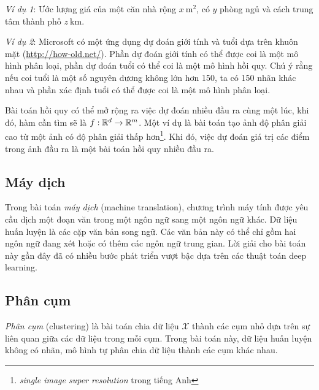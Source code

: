 \textit{Ví dụ 1}: Ước lượng giá của một căn nhà rộng $x ~ \text{m}^2$, có $y$
phòng ngủ và cách trung tâm thành phố $z~ \text{km}$.

\textit{Ví dụ 2}: Microsoft có một ứng dụng dự đoán giới tính và tuổi dựa trên
khuôn mặt (\url{http://how-old.net/}). Phần dự đoán giới tính có thể được coi là
một mô hình phân loại, phần dự đoán tuổi có thể coi là một mô hình hồi quy. Chú ý rằng nếu coi tuổi là một số nguyên dương không lớn hơn 150, ta có 150
nhãn khác nhau và phần xác định tuổi có thể được coi là một mô hình phân loại.

Bài toán hồi quy có thể mở rộng ra việc dự đoán nhiều đầu ra cùng một lúc,
khi đó, hàm cần tìm sẽ là $f: \mathbb{R}^d \rightarrow \mathbb{R}^m$. Một ví dụ là bài toán
{tạo ảnh độ phân giải cao} từ một ảnh có độ phân giải thấp hơn\footnote{\textit{single image super resolution} trong tiếng Anh}. Khi đó, việc dự đoán giá trị các điểm trong ảnh đầu ra là một bài toán hồi quy nhiều đầu ra.




\subsection{Máy dịch}
Trong bài toán \textit{máy dịch} (machine translation), chương trình máy tính được yêu cầu dịch một đoạn văn trong
một ngôn ngữ sang một ngôn ngữ khác. Dữ liệu huấn luyện là các cặp văn bản song
ngữ. Các văn bản này có thể chỉ gồm hai ngôn ngữ đang xét hoặc có thêm các ngôn
ngữ trung gian. Lời giải cho bài toán này gần đây đã có nhiều bước phát triển
vượt bậc dựa trên các thuật toán deep learning.

\subsection{Phân cụm}
\textit{Phân cụm} (clustering) là bài toán chia dữ liệu $\mathcal{X}$ thành các cụm nhỏ dựa trên sự liên
quan giữa các dữ liệu trong mỗi cụm. Trong bài toán này, dữ liệu huấn luyện không có nhãn, mô hình tự phân chia dữ liệu thành các cụm khác nhau.

